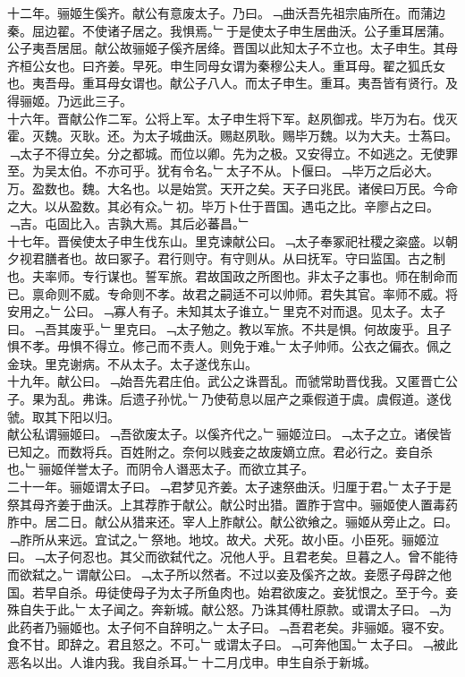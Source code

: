 \documentclass{zhvt-classic}
\begin{document}
\hspace*{2em}十二年。骊姬生傒齐。献公有意废太子。乃曰。﹁曲沃吾先祖宗庙所在。而蒲边秦。屈边翟。不使诸子居之。我惧焉。﹂于是使太子申生居曲沃。公子重耳居蒲。公子夷吾居屈。献公故骊姬子傒齐居绛。晋国以此知太子不立也。太子申生。其母齐桓公女也。曰齐姜。早死。申生同母女谓为秦穆公夫人。重耳母。翟之狐氏女也。夷吾母。重耳母女谓也。献公子八人。而太子申生。重耳。夷吾皆有贤行。及得骊姬。乃远此三子。\\
\hspace*{2em}十六年。晋献公作二军。公将上军。太子申生将下军。赵夙御戎。毕万为右。伐灭霍。灭魏。灭耿。还。为太子城曲沃。赐赵夙耿。赐毕万魏。以为大夫。士蒍曰。﹁太子不得立矣。分之都城。而位以卿。先为之极。又安得立。不如逃之。无使罪至。为吴太伯。不亦可乎。犹有令名。﹂太子不从。卜偃曰。﹁毕万之后必大。万。盈数也。魏。大名也。以是始赏。天开之矣。天子曰兆民。诸侯曰万民。今命之大。以从盈数。其必有众。﹂初。毕万卜仕于晋国。遇屯之比。辛廖占之曰。﹁吉。屯固比入。吉孰大焉。其后必蕃昌。﹂\\
\hspace*{2em}十七年。晋侯使太子申生伐东山。里克谏献公曰。﹁太子奉冢祀社稷之粢盛。以朝夕视君膳者也。故曰冢子。君行则守。有守则从。从曰抚军。守曰监国。古之制也。夫率师。专行谋也。誓军旅。君故国政之所图也。非太子之事也。师在制命而已。禀命则不威。专命则不孝。故君之嗣适不可以帅师。君失其官。率师不威。将安用之。﹂公曰。﹁寡人有子。未知其太子谁立。﹂里克不对而退。见太子。太子曰。﹁吾其废乎。﹂里克曰。﹁太子勉之。教以军旅。不共是惧。何故废乎。且子惧不孝。毋惧不得立。修己而不责人。则免于难。﹂太子帅师。公衣之偏衣。佩之金玦。里克谢病。不从太子。太子遂伐东山。\\
\hspace*{2em}十九年。献公曰。﹁始吾先君庄伯。武公之诛晋乱。而虢常助晋伐我。又匿晋亡公子。果为乱。弗诛。后遗子孙忧。﹂乃使荀息以屈产之乘假道于虞。虞假道。遂伐虢。取其下阳以归。\\
\hspace*{2em}献公私谓骊姬曰。﹁吾欲废太子。以傒齐代之。﹂骊姬泣曰。﹁太子之立。诸侯皆已知之。而数将兵。百姓附之。奈何以贱妾之故废嫡立庶。君必行之。妾自杀也。﹂骊姬佯誉太子。而阴令人谮恶太子。而欲立其子。\\
\hspace*{2em}二十一年。骊姬谓太子曰。﹁君梦见齐姜。太子速祭曲沃。归厘于君。﹂太子于是祭其母齐姜于曲沃。上其荐胙于献公。献公时出猎。置胙于宫中。骊姬使人置毒药胙中。居二日。献公从猎来还。宰人上胙献公。献公欲飨之。骊姬从旁止之。曰。﹁胙所从来远。宜试之。﹂祭地。地坟。故犬。犬死。故小臣。小臣死。骊姬泣曰。﹁太子何忍也。其父而欲弑代之。况他人乎。且君老矣。旦暮之人。曾不能待而欲弑之。﹂谓献公曰。﹁太子所以然者。不过以妾及傒齐之故。妾愿子母辟之他国。若早自杀。毋徒使母子为太子所鱼肉也。始君欲废之。妾犹恨之。至于今。妾殊自失于此。﹂太子闻之。奔新城。献公怒。乃诛其傅杜原款。或谓太子曰。﹁为此药者乃骊姬也。太子何不自辞明之。﹂太子曰。﹁吾君老矣。非骊姬。寝不安。食不甘。即辞之。君且怒之。不可。﹂或谓太子曰。﹁可奔他国。﹂太子曰。﹁被此恶名以出。人谁内我。我自杀耳。﹂十二月戊申。申生自杀于新城。\\
\end{document}
